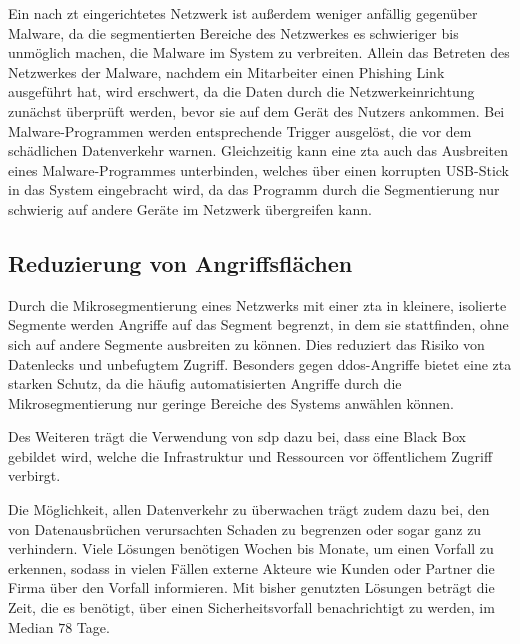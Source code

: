 Ein nach \ac{zt} eingerichtetes Netzwerk ist außerdem weniger anfällig gegenüber Malware, da die segmentierten Bereiche des Netzwerkes es schwieriger bis unmöglich machen, die Malware im System zu verbreiten.
Allein das Betreten des Netzwerkes der Malware, nachdem \zb ein Mitarbeiter einen Phishing Link ausgeführt hat, wird erschwert, da die Daten durch die Netzwerkeinrichtung zunächst überprüft werden, bevor sie auf dem Gerät des Nutzers ankommen.\autocite[\vglf][]{cunningham-2019}
Bei Malware-Programmen werden entsprechende Trigger ausgelöst, die vor dem schädlichen Datenverkehr warnen.\autocite[\vglf][]{cunningham-2019}
Gleichzeitig kann eine \ac{zta} auch das Ausbreiten eines Malware-Programmes unterbinden, welches \zb über einen korrupten USB-Stick in das System eingebracht wird, da das Programm durch die Segmentierung nur schwierig auf andere Geräte im Netzwerk übergreifen kann.\autocite[\vglf][]{cunningham-2019}

\subsection{Reduzierung von Angriffsflächen}\label{subsec:reduzierung-von-angriffsflachen}
Durch die Mikrosegmentierung eines Netzwerks mit einer \ac{zta} in kleinere, isolierte Segmente werden Angriffe auf das Segment begrenzt, in dem sie stattfinden, ohne sich auf andere Segmente ausbreiten zu können.
Dies reduziert das Risiko von Datenlecks und unbefugtem Zugriff.\autocites[\vglf][]{shore-2021}[\vglf][]{buck-2021}
Besonders gegen \ac{ddos}-Angriffe bietet eine \ac{zta} starken Schutz, da die häufig automatisierten Angriffe durch die Mikrosegmentierung nur geringe Bereiche des Systems anwählen können.\autocite[\vglf][]{Eidle-2017}

Des Weiteren trägt die Verwendung von \ac{sdp} dazu bei, dass eine Black Box gebildet wird, welche die Infrastruktur und Ressourcen vor öffentlichem Zugriff verbirgt.\autocites[\vglf][]{buck-2021}[\vglf][]{kumar-2019}

Die Möglichkeit, allen Datenverkehr zu überwachen trägt zudem dazu bei, den von Datenausbrüchen verursachten Schaden zu begrenzen oder sogar ganz zu verhindern.\autocite[\vglf][]{cunningham-2019}
Viele Lösungen benötigen Wochen bis Monate, um einen Vorfall zu erkennen, sodass in vielen Fällen externe Akteure wie Kunden oder Partner die Firma über den Vorfall informieren.\autocite[\vglf][]{cunningham-2019}
Mit bisher genutzten Lösungen beträgt die Zeit, die es benötigt, über einen Sicherheitsvorfall benachrichtigt zu werden, im Median $78$ Tage.\autocite[\vglf][]{fireeye-2019}

